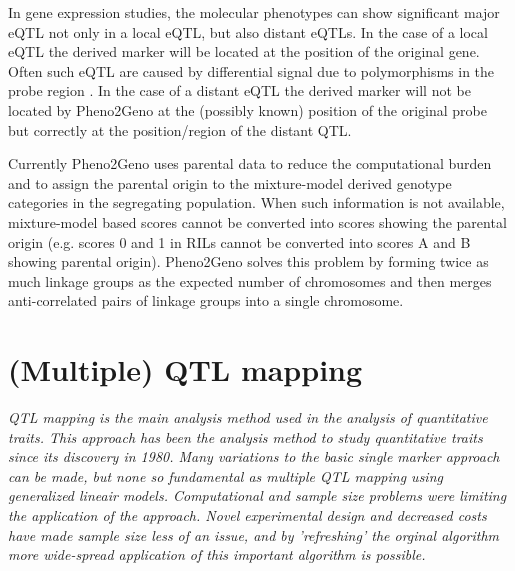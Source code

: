 \documentclass[8pt, twoside, a5paper]{report}
\begin{document}
In gene expression studies, the molecular phenotypes can show significant major eQTL not only in a local eQTL, but also distant eQTLs. 
In the case of a local eQTL the derived marker will be located at the position of the original gene. Often such eQTL are caused by 
differential signal due to polymorphisms in the probe region \cite{Alberts:2005,Alberts:2007}. In the case of a distant eQTL the 
derived marker will not be located by Pheno2Geno at the (possibly known) position of the original probe but correctly at the 
position/region of the distant QTL. \newline

Currently Pheno2Geno uses parental data to reduce the computational burden and to assign the parental origin to the mixture-model 
derived genotype categories in the segregating population. When such information is not available, mixture-model based scores 
cannot be converted into scores showing the parental origin (e.g. scores 0 and 1 in RILs cannot be converted into scores A and B 
showing parental origin). Pheno2Geno solves this problem by forming twice as much linkage groups as the expected number of 
chromosomes and then merges anti-correlated pairs of linkage groups into a single chromosome. \newline

\chapter{(Multiple) QTL mapping}

\emph{QTL mapping is the main analysis method used in the analysis of quantitative traits. This approach has been 
the analysis method to study quantitative traits since its discovery in 1980. Many variations to the basic single 
marker approach can be made, but none so fundamental as multiple QTL mapping using generalized lineair models. 
Computational and sample size problems were limiting the application of the approach. Novel experimental 
design and decreased costs have made sample size less of an issue, and by 'refreshing' the orginal algorithm 
more wide-spread application of this important algorithm is possible.}
\null
\vfill
\end{document}
